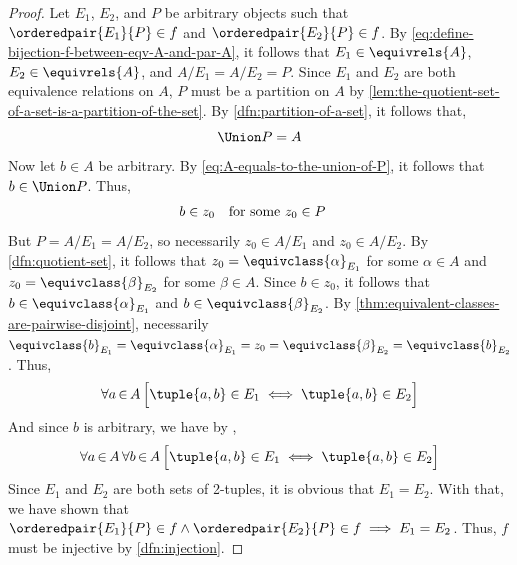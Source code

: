 \begin{proof}
    \vspace{0.2cm}
    \noindent
    Let \( E_{1} \), \( E_{2} \), and \( P \) be arbitrary objects such that \( \orderedpair{E_{1}}{P} \in f \)
    and \( \orderedpair{E_{2}}{P} \in f \). By \eqref{eq:define-bijection-f-between-eqv-A-and-par-A}, it follows
    that \( E_{1} \in \equivrels{A} \), \( E_{2} \in \equivrels{A} \), and \( A / E_{1} = A / E_{2} = P \).
    Since \( E_{1} \) and \( E_{2} \) are both equivalence relations on \( A \),
    \( P \) must be a partition on \( A \) by \cref{lem:the-quotient-set-of-a-set-is-a-partition-of-the-set}.
    By \cref{dfn:partition-of-a-set}, it follows that,
    \begin{equation}
        \label{eq:A-equals-to-the-union-of-P}
        \Union P = A
    \end{equation}
    Now let \( b \in A \) be arbitrary. By \eqref{eq:A-equals-to-the-union-of-P}, it follows that \( b \in \Union P \).
    Thus,
    \begin{equation*}
        \begin{aligned}
            b \in z_{0}&
        \end{aligned}
        \begin{aligned}
            &\text{for some \( z_{0} \in P \)}
        \end{aligned}
    \end{equation*}
    But \( P = A / E_{1} = A / E_{2} \), so necessarily \( z_{0} \in A / E_{1} \) and \( z_{0} \in A / E_{2} \). By \cref{dfn:quotient-set},
    it follows that \( z_{0} = \equivclass{\alpha}_{E_{1}} \) for some \( \alpha \in A \) and \( z_{0} = \equivclass{\beta}_{E_{2}} \) for
    some \( \beta \in A \).
    Since \( b \in z_{0} \), it follows that \( b \in \equivclass{\alpha}_{E_{1}} \) and
    \( b \in \equivclass{\beta}_{E_{2}} \). By \cref{thm:equivalent-classes-are-pairwise-disjoint}, necessarily
    \( \equivclass{b}_{E_{1}} = \equivclass{\alpha}_{E_{1}} = z_{0} = \equivclass{\beta}_{E_{2}} = \equivclass{b}_{E_{2}} \). Thus,
    \begin{equation*}
        \forall a\,{\in}\,A \, \Big[ \tuple{a,b} \in E_{1} \iff \tuple{a,b} \in E_{2} \Big]
    \end{equation*}
    And since \( b \) is arbitrary, we have by ,
    \begin{equation*}
        \forall a\,{\in}\,A \, \forall b\,{\in}\,A \, \Big[ \tuple{a,b} \in E_{1} \iff \tuple{a,b} \in E_{2} \Big]
    \end{equation*}
    Since \( E_{1} \) and \( E_{2} \) are both sets of 2-tuples, it is obvious that \( E_{1} = E_{2} \). With that,
    we have shown that \( \orderedpair{E_{1}}{P} \in f \land \orderedpair{E_{2}}{P} \in f \implies E_{1} = E_{2} \). Thus, \( f \)
    must be injective by \cref{dfn:injection}.


\end{proof}
